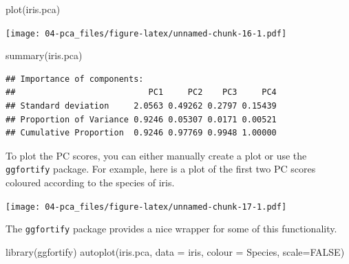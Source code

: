 \documentclass[
]{book}
\newenvironment{Shaded}{\begin{snugshade}}{\end{snugshade}}
\newcommand{\AttributeTok}[1]{\textcolor[rgb]{0.77,0.63,0.00}{#1}}
\newcommand{\ConstantTok}[1]{\textcolor[rgb]{0.00,0.00,0.00}{#1}}
\newcommand{\DecValTok}[1]{\textcolor[rgb]{0.00,0.00,0.81}{#1}}
\newcommand{\FunctionTok}[1]{\textcolor[rgb]{0.00,0.00,0.00}{#1}}
\newcommand{\NormalTok}[1]{#1}
\newcommand{\OtherTok}[1]{\textcolor[rgb]{0.56,0.35,0.01}{#1}}
\newcommand{\SpecialCharTok}[1]{\textcolor[rgb]{0.00,0.00,0.00}{#1}}
\newcommand{\StringTok}[1]{\textcolor[rgb]{0.31,0.60,0.02}{#1}}
\theoremstyle{definition}
\theoremstyle{definition}
\theoremstyle{definition}
\theoremstyle{definition}
\theoremstyle{remark}
\begin{document}
\begin{Shaded}
\begin{Highlighting}[]
\FunctionTok{plot}\NormalTok{(iris.pca)}
\end{Highlighting}
\end{Shaded}

\texttt{[image: 04-pca\_files/figure-latex/unnamed-chunk-16-1.pdf]}

\begin{Shaded}
\begin{Highlighting}[]
\FunctionTok{summary}\NormalTok{(iris.pca)}
\end{Highlighting}
\end{Shaded}

\begin{verbatim}
## Importance of components:
##                           PC1     PC2    PC3     PC4
## Standard deviation     2.0563 0.49262 0.2797 0.15439
## Proportion of Variance 0.9246 0.05307 0.0171 0.00521
## Cumulative Proportion  0.9246 0.97769 0.9948 1.00000
\end{verbatim}

To plot the PC scores, you can either manually create a plot or use the \texttt{ggfortify} package. For example, here is a plot of the first two PC scores coloured according to the species of iris.

\begin{Shaded}
\end{Shaded}

\texttt{[image: 04-pca\_files/figure-latex/unnamed-chunk-17-1.pdf]}

The \texttt{ggfortify} package provides a nice wrapper for some of this functionality.

\begin{Shaded}
\begin{Highlighting}[]
\FunctionTok{library}\NormalTok{(ggfortify)}
\FunctionTok{autoplot}\NormalTok{(iris.pca, }\AttributeTok{data =}\NormalTok{ iris, }\AttributeTok{colour =} \StringTok{\textquotesingle{}Species\textquotesingle{}}\NormalTok{, }\AttributeTok{scale=}\ConstantTok{FALSE}\NormalTok{)}
\end{Highlighting}
\end{Shaded}
\end{document}
